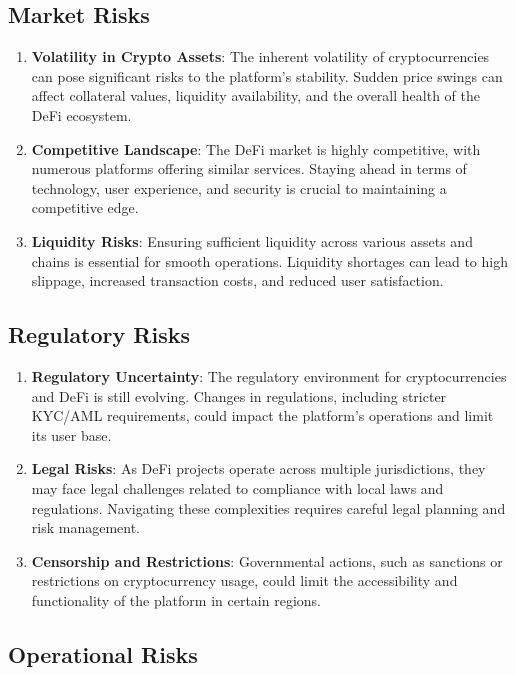 \documentclass[12pt, a4paper]{article}
\begin{document}
\subsection{Market Risks}

\begin{enumerate}
    \item \textbf{Volatility in Crypto Assets}: The inherent volatility of cryptocurrencies can pose significant risks to the platform's stability. Sudden price swings can affect collateral values, liquidity availability, and the overall health of the DeFi ecosystem.
    \item \textbf{Competitive Landscape}: The DeFi market is highly competitive, with numerous platforms offering similar services. Staying ahead in terms of technology, user experience, and security is crucial to maintaining a competitive edge.
    \item \textbf{Liquidity Risks}: Ensuring sufficient liquidity across various assets and chains is essential for smooth operations. Liquidity shortages can lead to high slippage, increased transaction costs, and reduced user satisfaction.
\end{enumerate}

\subsection{Regulatory Risks}

\begin{enumerate}
    \item \textbf{Regulatory Uncertainty}: The regulatory environment for cryptocurrencies and DeFi is still evolving. Changes in regulations, including stricter KYC/AML requirements, could impact the platform's operations and limit its user base.
    \item \textbf{Legal Risks}: As DeFi projects operate across multiple jurisdictions, they may face legal challenges related to compliance with local laws and regulations. Navigating these complexities requires careful legal planning and risk management.
    \item \textbf{Censorship and Restrictions}: Governmental actions, such as sanctions or restrictions on cryptocurrency usage, could limit the accessibility and functionality of the platform in certain regions.
\end{enumerate}

\subsection{Operational Risks}
\end{document}
